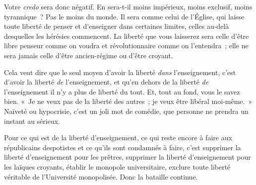 \documentclass[french,twoside]{book} %
\newcommand{\astertri}{\medskip\par\centerline{\color{rubric}\large\selectfont{\syms ✻\,✻\,✻}}\medskip\par}%
\begin{document}
Votre {\itshape credo} sera donc négatif. En sera-t-il moins impérieux, moins exclusif, moins tyrannique ? Pas le moins du monde. Il sera comme celui de l’Église, qui laisse toute liberté de penser et d’enseigner dans certaines limites, celles au-delà desquelles les hérésies commencent. La liberté que vous laisserez sera celle d’être libre penseur comme on voudra et révolutionnaire comme on l’entendra ;  elle ne sera jamais celle d’être ancien-régime ou d’être croyant.\par
Cela veut dire que le seul moyen d’avoir la liberté {\itshape dans} l’enseignement, c’est d’avoir la liberté {\itshape de} l’enseignement, et qu’en dehors de la liberté {\itshape de} l’enseignement il n’y a plus de liberté du tout. Et, tout au fond, vous le savez bien. « Je ne veux pas de la liberté des autres ; je veux être libéral moi-même. » Naïveté ou hypocrisie, c’est un joli mot de comédie, que personne ne prendra un instant au sérieux.\par
Pour ce qui est de la liberté d’enseignement, ce qui reste encore à faire aux républicains despotistes et ce qu’ils sont condamnés à faire, c’est supprimer la liberté d’enseignement pour les prêtres, supprimer la liberté d’enseignement pour les laïques croyants, établir le monopole universitaire, exclure toute liberté véritable de l’Université monopolisée. Donc la bataille continue.\par

\astertri
\end{document}
